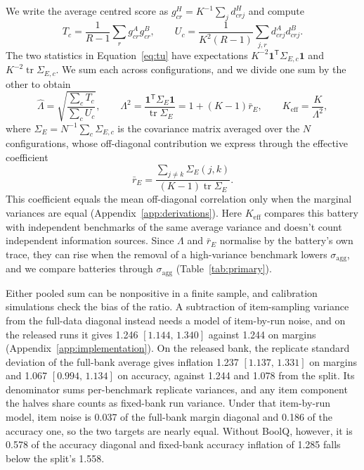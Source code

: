 \documentclass{article}
\newcommand{\ci}[2]{\ensuremath{[#1,\,#2]}}
\newcommand{\Lam}{\Lambda}
\newcommand{\Sig}{\Sigma_E}
\begin{document}
We write the average centred score as $g^H_{cr}=K^{-1}\sum_j d^H_{crj}$ and compute
\begin{equation}
T_c=\frac{1}{R-1}\sum_r g^A_{cr}g^B_{cr},\qquad
U_c=\frac{1}{K^2(R-1)}\sum_{j,r}d^A_{crj}d^B_{crj}.
\label{eq:tu}
\end{equation}
The two statistics in Equation~\ref{eq:tu} have expectations $K^{-2}\mathbf{1}^{\mathsf T}\Sigma_{E,c}\mathbf{1}$ and $K^{-2}\operatorname{tr}\Sigma_{E,c}$. We sum each across configurations, and we divide one sum by the other to obtain
\begin{equation}
\widehat\Lam=\sqrt{\frac{\sum_c T_c}{\sum_c U_c}},\qquad
\Lam^2=\frac{\mathbf{1}^{\mathsf T}\Sig\mathbf{1}}{\operatorname{tr}\Sig}
=1+(K-1)\bar r_E,\qquad K_{\mathrm{eff}}=\frac{K}{\Lam^2},
\label{eq:lambda}
\end{equation}
where $\Sig=N^{-1}\sum_c\Sigma_{E,c}$ is the covariance matrix averaged over the $N$ configurations, whose off-diagonal contribution we express through the effective coefficient
\begin{equation}
\bar r_E=\frac{\sum_{j\ne k}\Sigma_E(j,k)}{(K-1)\operatorname{tr}\Sig}.
\label{eq:effective}
\end{equation}
This coefficient equals the mean off-diagonal correlation only when the marginal variances are equal (Appendix~\ref{app:derivations}). Here $K_{\mathrm{eff}}$ compares this battery with independent benchmarks of the same average variance and doesn't count independent information sources. Since $\Lam$ and $\bar r_E$ normalise by the battery's own trace, they can rise when the removal of a high-variance benchmark lowers $\sigma_{\mathrm{agg}}$, and we compare batteries through $\sigma_{\mathrm{agg}}$ (Table~\ref{tab:primary}).

Either pooled sum can be nonpositive in a finite sample, and calibration simulations check the bias of the ratio. A subtraction of item-sampling variance from the full-data diagonal instead needs a model of item-by-run noise, and on the released runs it gives 1.246 \ci{1.144}{1.340} against 1.244 on margins (Appendix~\ref{app:implementation}). On the released bank, the replicate standard deviation of the full-bank average gives inflation 1.237 \ci{1.137}{1.331} on margins and 1.067 \ci{0.994}{1.134} on accuracy, against 1.244 and 1.078 from the split. Its denominator sums per-benchmark replicate variances, and any item component the halves share counts as fixed-bank run variance. Under that item-by-run model, item noise is 0.037 of the full-bank margin diagonal and 0.186 of the accuracy one, so the two targets are nearly equal. Without BoolQ, however, it is 0.578 of the accuracy diagonal and fixed-bank accuracy inflation of 1.285 falls below the split's 1.558.
\end{document}
